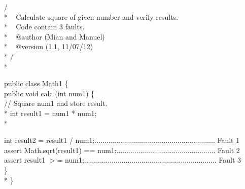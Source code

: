 \documentclass[conference]{IEEEtran}
\begin{document}
\begingroup

    \fontsize{7pt}{8pt}\selectfont
    
\noindent
/\textasteriskcentered \textasteriskcentered \\*
\textasteriskcentered   ~ Calculate square of given number and verify results. \\*
\textasteriskcentered   ~ Code contain 3 faults.\\*
\textasteriskcentered   ~ @author (Mian and Manuel) \\* 
\textasteriskcentered   ~ @version (1.1, 11/07/12)\\*
\textasteriskcentered / \\*

\noindent public class Math1 \{\\
\indent public void calc (int num1) \{\\

\indent // Square num1 and store result.\\*
\indent int result1 = num1 * num1;\\*

\indent int result2 = result1 / num1;............................................................. Fault 1\\

\indent assert Math.sqrt(result1) == num1;.................................................. Fault 2\\

\indent assert result1 $>$= num1;................................................................... Fault 3\\
\indent \}  \\*
\noindent\}\\
\end{document}
